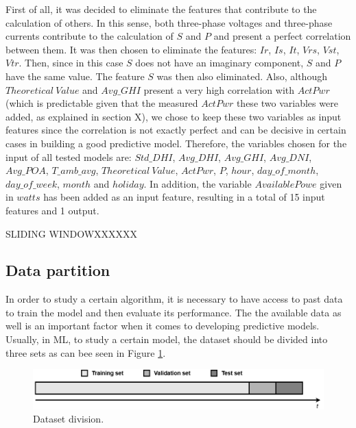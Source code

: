 First of all, it was decided to eliminate the features that contribute to the calculation of others. In this sense, both three-phase voltages and three-phase currents contribute to the calculation of $S$ and $P$ and present a perfect correlation between them. It was then chosen to eliminate the features: $Ir$, $Is$, $It$, $Vrs$, $Vst$, $Vtr$. Then, since in this case $S$ does not have an imaginary component, $S$ and $P$ have the same value. The feature $S$ was then also eliminated. Also, although $Theoretical\ Value$ and $Avg\_GHI$ present a very high correlation with $ActPwr$ (which is predictable given that the measured $ActPwr$ these two variables were added, as explained in section X), we chose to keep these two variables as input features since the correlation is not exactly perfect and can be decisive in certain cases in building a good predictive model. Therefore, the variables chosen for the input of all tested models are: $Std\_DHI$, $Avg\_DHI$, $Avg\_GHI$, $Avg\_DNI$, $Avg\_POA$, $T\_amb\_avg$, $Theoretical\ Value$, $ActPwr$, $P$, $hour$, $day\_of\_month$, $day\_of\_week$, $month$ and $holiday$. In addition, the variable $Available Powe$ given in $watts$ has been added as an input feature, resulting in a total of 15 input features and 1 output.



SLIDING WINDOWXXXXXX

\subsection{Data partition}\label{sec:datap}

In order to study a certain algorithm, it is necessary to have access to past data to train the model and then evaluate its performance. The the available data as well is an important factor when it comes to developing predictive models. Usually, in \ac{ML}, to study a certain model, the dataset should be divided into three sets as can bee seen in Figure \ref{division}. 

\begin{figure}[h!]
    \centering
    \begin{center}
    \includegraphics[width=1\textwidth]{Images/division.png}
    \caption{Dataset division.}
    \label{division}
    \end{center}
\end{figure}

